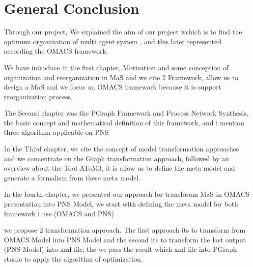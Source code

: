 
\chapter*{General Conclusion}


Through our project, We explained the aim of our project wchich is to find the optimum organization of multi agent system 
, and this later represented according the OMACS framework.

We have introduce in the first chapter, Motivation and some conception of organization and reorganization in MaS and we cite 2 Framework, 
allow us to design a MaS and we focus on OMACS framework because it is support reorganization process.

The Second chapter was the PGraph Framework and Process Network Synthesis, the basic concept and mathematical definition  of this framework, and i mention 
three algorithm applicable on PNS 

In the Third chapter, we cite the concept of model transformation approaches and we concentrate on the Graph transformation approach, followed by an overview about the Tool AToM3, it is allow us to define the meta model and generate a formalism from these meta model.

In the fourth chapter, we presented our approach for transforam MaS in OMACS presentation into PNS Model, we start with defining the meta model for both framework i use (OMACS and PNS)

we propose 2 transformation approach. The first approach its to transform from OMACS Model into PNS Model and the second its to transform the last output (PNS Model) into xml file, the we pass the result which xml file into PGraph studio to apply the algorithm of optimization. 